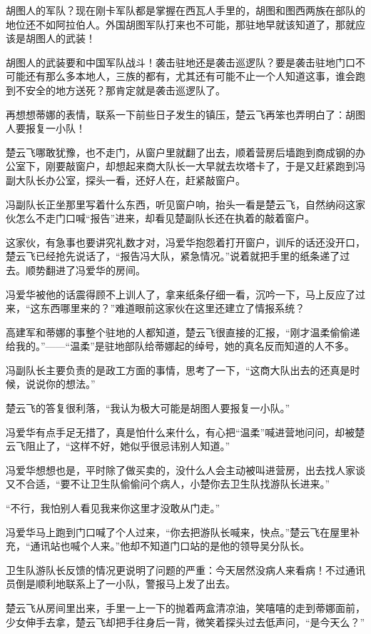 胡图人的军队？现在刚卡军队都是掌握在西瓦人手里的，胡图和图西两族在部队的地位还不如阿拉伯人。外国胡图军队打来也不可能，那驻地早就该知道了，那就应该是胡图人的武装！

胡图人的武装要和中国军队战斗！袭击驻地还是袭击巡逻队？要是袭击驻地门口不可能还有那么多本地人，三族的都有，尤其还有可能不止一个人知道这事，谁会跑到不安全的地方送死？那肯定就是袭击巡逻队了。

再想想蒂娜的表情，联系一下前些日子发生的镇压，楚云飞再笨也弄明白了：胡图人要报复一小队！

楚云飞哪敢犹豫，也不走门，从窗户里就翻了出去，顺着营房后墙跑到商成钢的办公室下，刚要敲窗户，却想起来商大队长一大早就去坎塔卡了，于是又赶紧跑到冯副大队长办公室，探头一看，还好人在，赶紧敲窗户。

冯副队长正坐那里写着什么东西，听见窗户响，抬头一看是楚云飞，自然纳闷这家伙怎么不走门口喊“报告”进来，却看见楚副队长还在执着的敲着窗户。

这家伙，有急事也要讲究礼数才对，冯爱华抱怨着打开窗户，训斥的话还没开口，楚云飞已经抢先说话了，“报告冯大队，紧急情况。”说着就把手里的纸条递了过去。顺势翻进了冯爱华的房间。

冯爱华被他的话震得顾不上训人了，拿来纸条仔细一看，沉吟一下，马上反应了过来，“这东西哪里来的？”难道眼前这家伙在这里还建立了情报系统？

高建军和蒂娜的事整个驻地的人都知道，楚云飞很直接的汇报，“刚才温柔偷偷递给我的。”——“温柔”是驻地部队给蒂娜起的绰号，她的真名反而知道的人不多。

冯副队长主要负责的是政工方面的事情，思考了一下，“这商大队出去的还真是时候，说说你的想法。”

楚云飞的答复很利落，“我认为极大可能是胡图人要报复一小队。”

冯爱华有点手足无措了，真是怕什么来什么，有心把“温柔”喊进营地问问，却被楚云飞阻止了，“这样不好，她似乎很忌讳别人知道。”

冯爱华想想也是，平时除了做买卖的，没什么人会主动被叫进营房，出去找人家谈又不合适，“要不让卫生队偷偷问个病人，小楚你去卫生队找游队长进来。”

“不行，我怕别人看见我来你这里才没敢从门走。”

冯爱华马上跑到门口喊了个人过来，“你去把游队长喊来，快点。”楚云飞在屋里补充，“通讯站也喊个人来。”他却不知道门口站的是他的领导吴分队长。

卫生队游队长反馈的情况更说明了问题的严重：今天居然没病人来看病！不过通讯员倒是顺利地联系上了一小队，警报马上发了出去。

楚云飞从房间里出来，手里一上一下的抛着两盒清凉油，笑嘻嘻的走到蒂娜面前，少女伸手去拿，楚云飞却把手往身后一背，微笑着探头过去低声问，“是今天么？”

